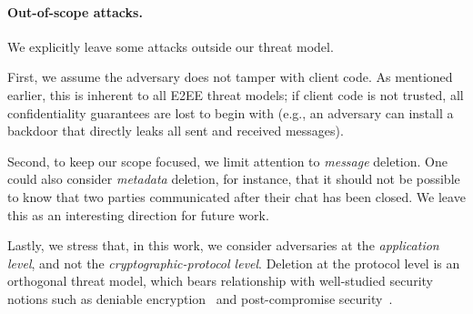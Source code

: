 \paragraph{Out-of-scope attacks.} We explicitly leave some attacks outside our threat model.

First, we assume the adversary does not tamper with client code. As mentioned earlier, this is inherent to all E2EE threat models; if client code is not trusted, all confidentiality guarantees are lost to begin with (e.g., an adversary can install a backdoor that directly leaks all sent and received messages).

Second, to keep our scope focused, we limit attention to \emph{message} deletion. One could also consider \emph{metadata} deletion, for instance, that it should not be possible to know that two parties communicated after their chat has been closed. We leave this as an interesting direction for future work.

Lastly, we stress that, in this work, we consider adversaries at the \emph{application level}, and not the \emph{cryptographic-protocol level}. Deletion at the protocol level is an orthogonal threat model, which bears relationship with well-studied security notions such as deniable encryption~\cite{} and post-compromise security~\cite{}.






